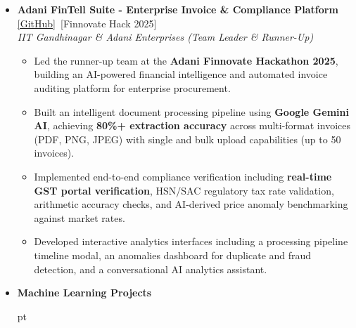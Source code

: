 \documentclass[a4paper,10pt]{article}
\newcommand{\isep}{-2 pt}
\begin{document}
\begin{itemize}
\begin{itemize}
    \end{itemize}



    \item \textbf{Adani FinTell Suite - Enterprise Invoice \& Compliance Platform} \underline{\href{https://github.com/devvrat-hans/adani-fintell-suite}{[GitHub]}}\ \hfill [Finnovate Hack 2025] \\
    \textit{IIT Gandhinagar \& Adani Enterprises (Team Leader \& Runner-Up)}
    \\[-0.7cm]

    \begin{itemize}\itemsep \isep

        \item Led the runner-up team at the \textbf{Adani Finnovate Hackathon 2025}, building an AI-powered financial intelligence and automated invoice auditing platform for enterprise procurement.

        \item Built an intelligent document processing pipeline using \textbf{Google Gemini AI}, achieving \textbf{80\%+ extraction accuracy} across multi-format invoices (PDF, PNG, JPEG) with single and bulk upload capabilities (up to 50 invoices).

        \item Implemented end-to-end compliance verification including \textbf{real-time GST portal verification}, HSN/SAC regulatory tax rate validation, arithmetic accuracy checks, and AI-derived price anomaly benchmarking against market rates.

        \item Developed interactive analytics interfaces including a processing pipeline timeline modal, an anomalies dashboard for duplicate and fraud detection, and a conversational AI analytics assistant.

    \end{itemize}



    \item \textbf{Machine Learning Projects}
    \\[-0.7cm]

    \begin{itemize}\itemsep \isep



\end{itemize}
\end{itemize}
\end{document}
